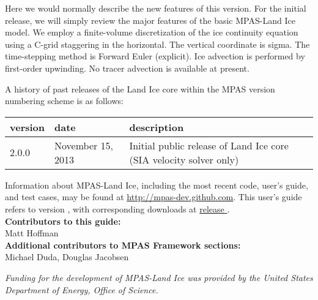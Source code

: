 Here we would normally describe the new features of this version.  For the initial release, we will simply review the major features of the basic MPAS-Land Ice model.  We employ a finite-volume discretization of the ice continuity equation using a C-grid staggering in the horizontal.  The vertical coordinate is sigma.  The time-stepping method is Forward Euler (explicit).  Ice advection is performed by first-order upwinding.  No tracer advection is available at present.  


A history of past releases of the Land Ice core within the MPAS version numbering scheme is as follows:

\begin{tabular}{lll} 
\hline\hline version & date & description  \\
\hline 
2.0.0 & November 15, 2013 & Initial public release of Land Ice core (SIA velocity solver only) \\
\hline 
\end{tabular} 

Information about MPAS-Land Ice, including the most recent code, user's guide, and test cases, may be found at \url{http://mpas-dev.github.com}.  This user's guide refers to version \version, with corresponding downloads at \href{http://mpas-dev.github.com/landice/release_\version/release_\version.html}{release \version}. \\

\vspace{8pt}
\noindent
{\bf Contributors to this guide:}\\
Matt Hoffman\\
{\bf Additional contributors to MPAS Framework sections:}\\
Michael Duda, Douglas Jacobsen

\vspace{8pt}
\noindent
{\it Funding for the development of MPAS-Land Ice was provided by the United States Department of Energy, Office of Science.}




